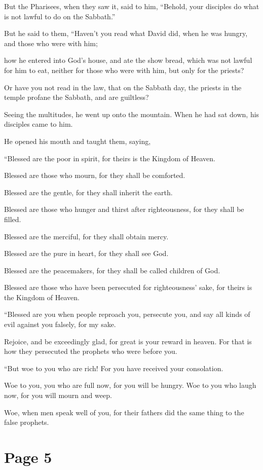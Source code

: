 But the Pharisees, when they saw it, said to him, “Behold, your disciples do what is not lawful to do on the Sabbath.”

But he said to them, “Haven’t you read what David did, when he was hungry, and those who were with him;

how he entered into God’s house, and ate the show bread, which was not lawful for him to eat, neither for those who were with him, but only for the priests?

Or have you not read in the law, that on the Sabbath day, the priests in the temple profane the Sabbath, and are guiltless?

Seeing the multitudes, he went up onto the mountain. When he had sat down, his disciples came to him.

He opened his mouth and taught them, saying,

“Blessed are the poor in spirit, for theirs is the Kingdom of Heaven.

Blessed are those who mourn, for they shall be comforted.

Blessed are the gentle, for they shall inherit the earth.

Blessed are those who hunger and thirst after righteousness, for they shall be filled.

Blessed are the merciful, for they shall obtain mercy.

Blessed are the pure in heart, for they shall see God.

Blessed are the peacemakers, for they shall be called children of God.

Blessed are those who have been persecuted for righteousness’ sake, for theirs is the Kingdom of Heaven.

“Blessed are you when people reproach you, persecute you, and say all kinds of evil against you falsely, for my sake.

Rejoice, and be exceedingly glad, for great is your reward in heaven. For that is how they persecuted the prophets who were before you.

“But woe to you who are rich! For you have received your consolation.

Woe to you, you who are full now, for you will be hungry. Woe to you who laugh now, for you will mourn and weep.

Woe, when men speak well of you, for their fathers did the same thing to the false prophets.



\chapterornament
\section*{Page 5}


